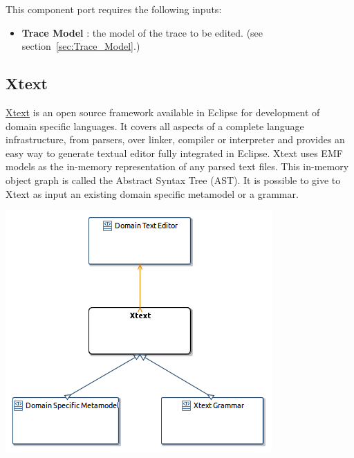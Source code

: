 \documentclass{gemoc} %
\begin{document}
This component port requires the following inputs:
\begin{itemize}
  \item \textbf{Trace Model} :
the model of the trace to be edited.
(see section~\ref{sec:Trace_Model}.)
\end{itemize}



\subsection{Xtext}
\label{sec:Xtext}

\href{http://www.eclipse.org/Xtext}{Xtext} is an open source framework available in Eclipse for development of domain specific languages.
It covers all aspects of a complete language infrastructure, from parsers, over linker, compiler or interpreter and provides an easy way to generate textual editor fully integrated in Eclipse.
Xtext uses EMF models as the in-memory representation of any parsed text files. This in-memory object graph is called the Abstract Syntax Tree (AST).
It is possible to give to Xtext as input an existing domain specific metamodel or a grammar.
\begin{center}
\includegraphics*[trim=0.0cm 0.0cm 0cm 0.0cm, clip=true]{../images/generated/Generated_Xtext.png}
\end{center}
\end{document}
